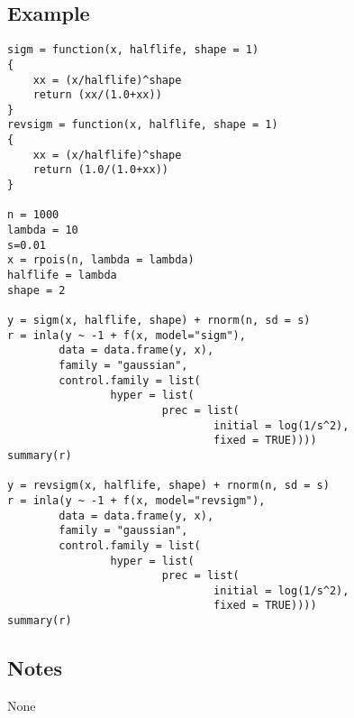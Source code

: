 \documentclass[a4paper,11pt]{article}
\begin{document}
\subsection*{Example}

\begin{verbatim}
sigm = function(x, halflife, shape = 1)
{
    xx = (x/halflife)^shape
    return (xx/(1.0+xx))
}
revsigm = function(x, halflife, shape = 1)
{
    xx = (x/halflife)^shape
    return (1.0/(1.0+xx))
}

n = 1000
lambda = 10
s=0.01
x = rpois(n, lambda = lambda)
halflife = lambda
shape = 2

y = sigm(x, halflife, shape) + rnorm(n, sd = s)
r = inla(y ~ -1 + f(x, model="sigm"),
        data = data.frame(y, x),
        family = "gaussian",
        control.family = list(
                hyper = list(
                        prec = list(
                                initial = log(1/s^2),
                                fixed = TRUE))))
summary(r)

y = revsigm(x, halflife, shape) + rnorm(n, sd = s)
r = inla(y ~ -1 + f(x, model="revsigm"),
        data = data.frame(y, x),
        family = "gaussian",
        control.family = list(
                hyper = list(
                        prec = list(
                                initial = log(1/s^2),
                                fixed = TRUE))))
summary(r)
\end{verbatim}

\subsection*{Notes}
None
\end{document}
